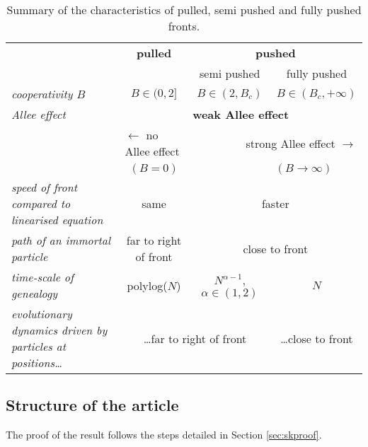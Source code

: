 \documentclass[11pt]{article}
\theoremstyle{plain}
\begin{document}
\begin{table}[ht]
\begin{center}
\begin{tabular}{|p{5cm}|c|c|c|}
\hline 
  & \textbf{pulled} & \multicolumn{2}{c|}{\textbf{pushed}} \\ 
  &   & semi pushed & fully pushed \\ 
\hline 
\textit{cooperativity $B$}& $B\in(0,2]$ & $B\in(2,B_c)$ & $B\in(B_c,+\infty)$\\
\hline
\textit{Allee effect} &\multicolumn{3}{c|}{\textbf{weak Allee effect}} \\ 
\textit{} & \multicolumn{1}{l}{$\leftarrow$ no Allee effect} &\multicolumn{2}{r|}{  strong Allee effect $\rightarrow$}\\
\textit{} & \multicolumn{1}{c}{$(B=0)$} &\multicolumn{2}{c|}{  $\qquad \qquad \quad (B\to\infty)$}\\
\hline 
\textit{speed of front compared to linearised equation} & same & \multicolumn{2}{c|}{faster} \\ 
\hline 
\textit{path of an immortal particle} & far to right of front & \multicolumn{2}{c|}{close to front} \\ 
\hline
\textit{time-scale of genealogy} & polylog($N$) & $N^{\alpha-1}$, $\alpha\in(1,2)$ & $N$ \\ 
\hline
\textit{evolutionary dynamics driven by particles at positions\ldots} & \multicolumn{2}{c|}{\ldots far to right of front} & \ldots close to front \\ 
\hline

\end{tabular} 
\end{center}
\caption{\label{tab:pulled_pushed} Summary of the characteristics of pulled, semi pushed and fully pushed fronts. }
\end{table}

\subsection{Structure of the article}

The proof of the result follows the steps detailed in Section \ref{sec:skproof}. 
\end{document}

